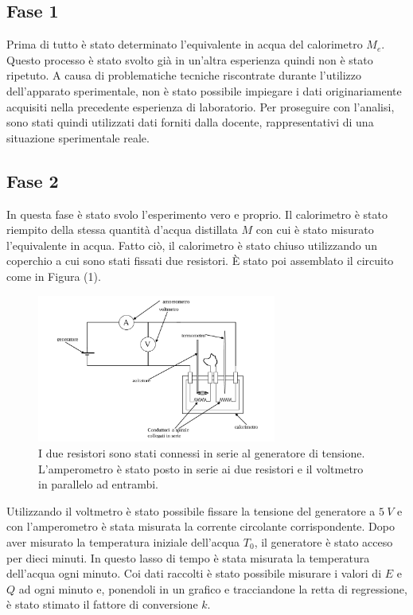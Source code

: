 \subsection{Fase 1}
Prima di tutto è stato determinato l'equivalente in acqua del calorimetro $M_e$. Questo processo è stato svolto già in un'altra esperienza quindi non è stato ripetuto. A causa di problematiche tecniche riscontrate durante l'utilizzo dell'apparato sperimentale, non è stato possibile impiegare i dati originariamente acquisiti nella precedente esperienza di laboratorio. Per proseguire con l'analisi, sono stati quindi utilizzati dati forniti dalla docente, rappresentativi di una situazione sperimentale reale.

\subsection{Fase 2}
In questa fase è stato svolo l'esperimento vero e proprio. Il calorimetro è stato riempito della stessa quantità d'acqua distillata $M$ con cui è stato misurato l'equivalente in acqua. Fatto ciò, il calorimetro è stato chiuso utilizzando un coperchio a cui sono stati fissati due resistori. È stato poi assemblato il circuito come in Figura (1).

\begin{figure}[H]
	\centering
	\includegraphics[width=0.70\textwidth]{./figures/Circuito}
	\caption{I due resistori sono stati connessi in serie al generatore di tensione. L'amperometro è stato posto in serie ai due resistori e il voltmetro in parallelo ad entrambi.}
\end{figure}

Utilizzando il voltmetro è stato possibile fissare la tensione del generatore a $5\ V$ e con l'amperometro è stata misurata la corrente circolante corrispondente. Dopo aver misurato la temperatura iniziale dell'acqua $T_0$, il generatore è stato acceso per dieci minuti. In questo lasso di tempo è stata misurata la temperatura dell'acqua ogni minuto. Coi dati raccolti è stato possibile misurare i valori di $E$ e $Q$ ad ogni minuto e, ponendoli in un grafico e tracciandone la retta di regressione, è stato stimato il fattore di conversione $k$.